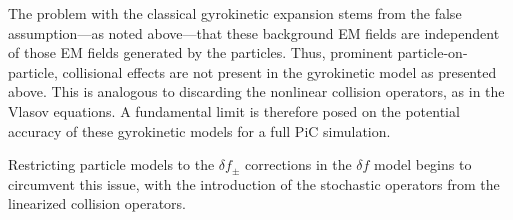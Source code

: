     The problem with the classical gyrokinetic expansion stems from the false assumption---as noted above---that these background EM fields are independent of those EM fields generated by the particles. Thus, prominent particle-on-particle, collisional effects are not present in the gyrokinetic model as presented above. This is analogous to discarding the nonlinear collision operators, as in the Vlasov equations. A fundamental limit is therefore posed on the potential accuracy of these gyrokinetic models for a full PiC simulation.

    Restricting particle models to the $\delta\!f_{\pm}$ corrections in the $\delta\!f$ model begins to circumvent this issue, with the introduction of the stochastic operators from the linearized collision operators.
        


